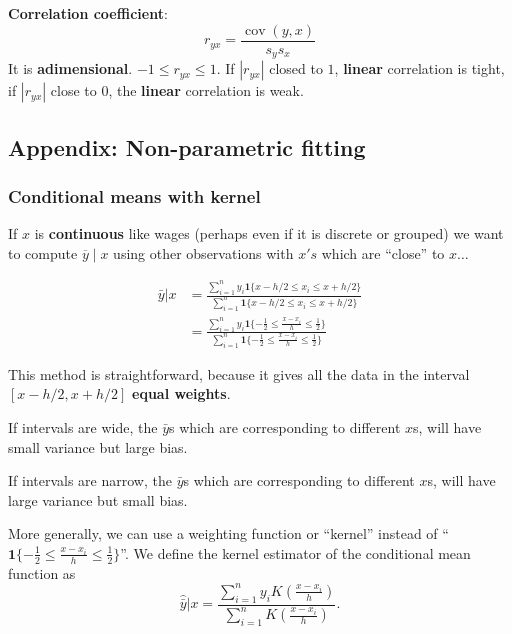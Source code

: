 \textbf{Correlation coefficient}: \[
    r _ {y x} = \frac {\operatorname {c o v} (y , x)}{s _ {y} s _ {x}}
\]
It is \textbf{adimensional}. $-1 \leq r_{yx} \leq 1$. If $\left| r_{yx} \right| $ closed to $1$, \textbf{linear} correlation is tight, if $\left| r_{yx} \right| $ close to $0$, the \textbf{linear} correlation is weak.



\subsection{Appendix: Non-parametric fitting}

\subsubsection{Conditional means with kernel} If \(x\) is \textbf{continuous} like wages (perhaps even if it is discrete or grouped) we want to compute \(\overline{y} \mid x\) using other observations with \(x's\) which are ``close'' to \(x \ldots\)

\begin{align*}
    \bar{y} | x & = \frac{\sum_{i=1}^{n} y_i \textbf{1}\{x -h/2 \leq x_i \leq x + h/2\}}{\sum_{i=1}^{n}\textbf{1}\{x -h/2 \leq x_i \leq x + h/2\}}                                          \\
                & = \frac{\sum_{i=1}^{n} y_i \textbf{1}\{-\frac{1}{2}\leq \frac{x-x_i}{h}\leq \frac{1}{2}\}}{\sum_{i=1}^{n} \textbf{1}\{-\frac{1}{2}\leq \frac{x-x_i}{h}\leq \frac{1}{2}\}}
\end{align*}

\begin{remark*}
    This method is straightforward, because it gives all the data in the interval $[x-h/2, x+h/2]$ \textbf{equal weights}.

    If intervals are wide, the $\bar{y}$s which are corresponding to different $x$s, will have small variance but large bias.

    If intervals are narrow, the $\bar{y}$s which are corresponding to different $x$s, will have large variance but small bias.
\end{remark*}

More generally, we can use a weighting function or ``kernel'' instead of ``$\textbf{1}\{-\frac{1}{2}\leq \frac{x-x_i}{h}\leq \frac{1}{2}\}$''. We define the kernel estimator of the conditional mean function as \[
    \hat{\bar{y}} | x = \frac{\sum_{i=1}^{n} y_i K(\frac{x-x_i}{h})}{\sum_{i=1}^{n} K(\frac{x-x_i}{h})}.
\]

